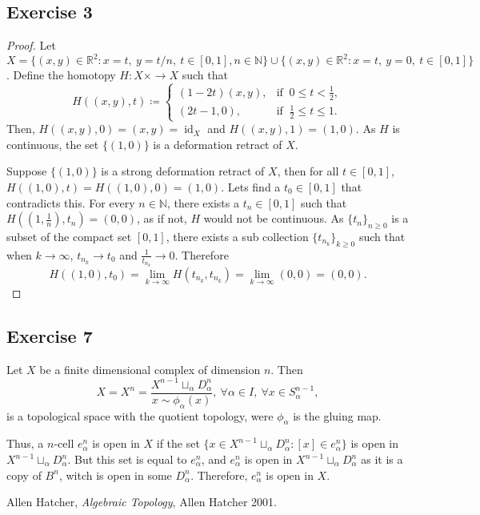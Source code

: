 \documentclass[11pt,a4paper]{article}
\newcommand{\id}{\operatorname{id}}
\begin{document}
\subsection*{Exercise 3}
\begin{proof}
  Let $ X = \{(x, y) \in \mathbb R^2 \colon x = t, \ y = t/n, \ t \in [0, 1], n \in \mathbb N \} \cup \{(x, y) \in \mathbb R^2 \colon x = t, \ y = 0, \ t \in [0, 1]\}  $. Define the homotopy $ H \colon X \times \to X $ such that
  $$
    H((x, y), t) \coloneqq
    \begin{cases} 
      (1-2t)(x, y), & \text{if  } \ 0 \leq t < \frac{1}{2}, \\ 
      (2t - 1, 0), & \text{if  } \ \frac{1}{2} \leq t \leq 1. 
    \end{cases}
  $$
  Then, $ H((x, y), 0) = (x, y) = \id_X $ and $ H((x, y), 1) = (1, 0) $. As $ H $ is continuous, the set $ \{ (1, 0) \} $ is a deformation retract of $ X $.
  \vspace{0.5cm}

  Suppose $ \{ (1, 0) \} $ is a strong deformation retract of $ X $, then for all $ t \in [0, 1]$, $ H((1, 0), t) = H((1, 0), 0) = (1, 0) $. Lets find a $ t_0 \in [0, 1]$ that contradicts this. For every $ n \in \mathbb N $, there exists a $ t_n \in [0, 1] $ such that $ H((1, \frac{1}{n}), t_n) = (0, 0) $, as if not, $ H $ would not be continuous. As $\{t_n\}_{n \geq 0}$ is a subset of the compact set $[0, 1]$, there exists a sub collection $\{t_{n_k}\}_{k \geq 0}$ such that when $ k \rightarrow \infty $, $ t_{n_k} \rightarrow t_0 $ and $\frac{1}{t_{n_k}} \rightarrow 0 $. Therefore
  $$
    H((1, 0), t_0) = \lim_{k \to \infty} H({t_{n_k}}, t_{n_k}) = \lim_{k \to \infty} (0,0) = (0, 0).
  $$
\end{proof}

\subsection*{Exercise 7}
Let $ X $ be a finite dimensional complex of dimension $ n $. Then
$$
  X = X^n = \frac{X^{n-1} \sqcup_\alpha D_\alpha^n}{x \sim \phi_\alpha(x)}, \ \forall \alpha \in I, \ \forall x \in S_\alpha^{n-1}, 
$$
is a topological space with the quotient topology, were $ \phi_\alpha $ is the gluing map.

Thus, a $n$-cell $e_\alpha^n$ is open in $ X $ if the set $ \{ x\in X^{n-1} \sqcup_\alpha D_\alpha^n \colon [x] \in e_\alpha^n\} $ is open in $X^{n-1} \sqcup_\alpha D_\alpha^n $. But this set is equal to $ e_\alpha^n $, and $ e_\alpha^n $ is open in $ X^{n-1} \sqcup_\alpha D_\alpha^n $ as it is a copy of $ B^n $, witch is open in some $ D_\alpha^n $. Therefore, $ e_\alpha^n $ is open in $ X $.


\begin{thebibliography}{9}

  Allen Hatcher,
  \textit{Algebraic Topology},
  Allen Hatcher 2001.
  
\end{thebibliography}
\end{document}
